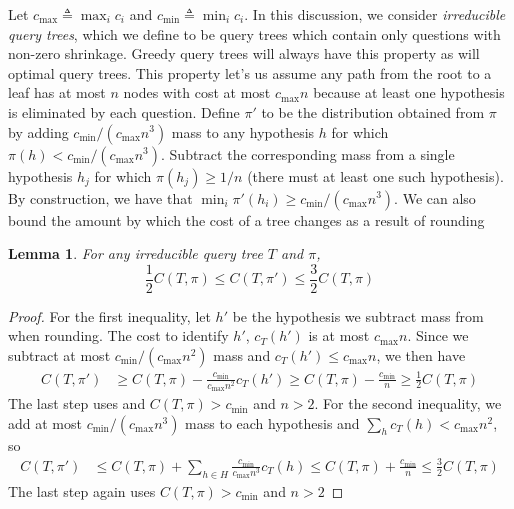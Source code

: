 \documentclass{article}
\newtheorem{lemma}{Lemma}
\begin{document}
Let $c_{\max} \triangleq \max_{i} c_i$ and $c_{\min} \triangleq
\min_{i} c_i$.  In this discussion, we consider \emph{irreducible
  query trees}, which we define to be query trees which contain only
questions with non-zero shrinkage.  Greedy query trees will always
have this property as will optimal query trees.  This property let's
us assume any path from the root to a leaf has at most $n$ nodes with
cost at most $c_{\max}n$ because at least one hypothesis is eliminated
by each question.  Define $\pi'$ to be the distribution obtained from
$\pi$ by adding $c_{\min}/(c_{\max}n^3)$ mass to any hypothesis $h$
for which $\pi(h) < c_{\min}/(c_{\max}n^3)$.  Subtract the
corresponding mass from a single hypothesis $h_j$ for which $\pi(h_j)
\geq 1/n$ (there must at least one such hypothesis).  By construction,
we have that $\min_{i} \pi'(h_i) \geq c_{\min}/(c_{\max}n^3)$.  We can
also bound the amount by which the cost of a tree changes as a result
of rounding
\begin{lemma} For any irreducible query tree $T$ and $\pi$, 
\[ \frac{1}{2}C(T, \pi) \leq C(T, \pi') \leq \frac{3}{2} C(T, \pi) \] 
\label{costdistlma}
\end{lemma}
\begin{proof}
For the first inequality, let $h'$ be the hypothesis we subtract
mass from when rounding.  The cost to identify $h'$,
$c_T(h')$ is at most $c_{\max} n$.
Since we subtract at most
$c_{\min}/(c_{\max}n^2)$ mass and $c_T(h') \leq c_{\max}n$, we then have
\begin{align*}
C(T, \pi') & \geq C(T, \pi) - \frac{c_{\min}}{c_{\max}n^2} c_T(h') 
\geq C(T, \pi) - \frac{c_{\min}}{n} 
\geq \frac{1}{2} C(T, \pi)
\end{align*}
The last step uses and $C(T, \pi) > c_{\min}$ and $n>2$.
For the second inequality, we add at most $c_{\min}/(c_{\max}n^3)$
mass to each hypothesis and $\sum_{h} c_T(h) < c_{\max} n^2$, so
\begin{align*}
C(T, \pi') & \leq C(T, \pi) + \sum_{h \in H} \frac{c_{\min}}{c_{\max}n^3} c_T(h) 
\leq C(T, \pi) + \frac{c_{\min}}{n} 
\leq \frac{3}{2} C(T, \pi)  
\end{align*}
The last step again uses $C(T, \pi) > c_{\min}$ and $n>2$
\end{proof}
\end{document}
